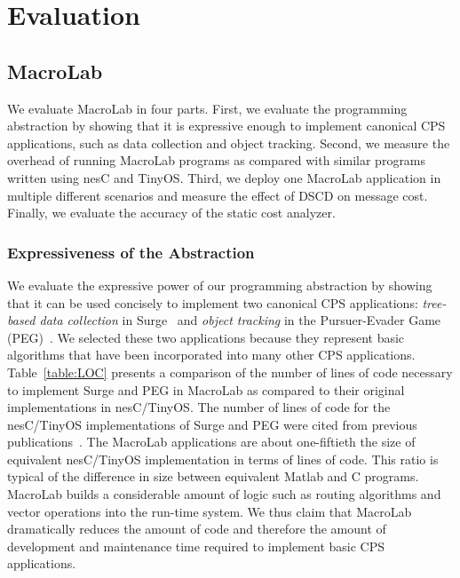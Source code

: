 \chapter{Evaluation} \label{sect:evaluation}

\section{MacroLab}

We evaluate MacroLab in four parts. First, we evaluate the
programming abstraction by showing that it is expressive enough to
implement canonical CPS applications, such as data
collection and object tracking. Second, we measure the overhead of
running MacroLab programs as compared with similar programs written
using nesC and TinyOS. Third, we deploy one MacroLab application in
multiple different scenarios and measure the effect of DSCD on
message cost. Finally, we evaluate the accuracy of the static cost
analyzer.

\subsection{Expressiveness of the Abstraction}\label{sect:expressiveness}

We evaluate the expressive power of our programming abstraction by
showing that it can be used concisely to implement two canonical
CPS applications: {\em tree-based data collection} in Surge~\cite{Gay}
and {\em object tracking} in the Pursuer-Evader Game
(PEG)~\cite{Sharp}. We selected these two applications because they
represent basic algorithms that have been incorporated into many other
CPS applications.  Table~\ref{table:LOC} presents a
comparison of the number of lines of code necessary to implement Surge
and PEG in MacroLab as compared to their original implementations in
nesC/TinyOS. The number of lines of code for the nesC/TinyOS
implementations of Surge and PEG were cited from previous
publications~\cite{Muller,Kothari}.  The MacroLab applications
are about one-fiftieth the size of equivalent nesC/TinyOS implementation
in terms of lines of code. This ratio is typical of the difference in
size between equivalent Matlab and C programs. MacroLab builds a
considerable amount of logic such as routing algorithms and vector
operations into the run-time system.  We thus claim that MacroLab
dramatically reduces the amount of code and therefore the amount of
development and maintenance time required to implement basic CPS
applications.

